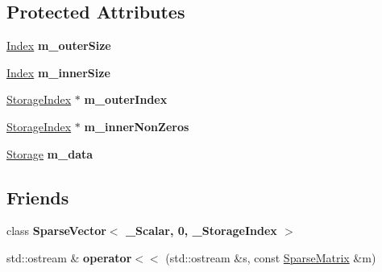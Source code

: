 \subsection*{Protected Attributes}
\begin{DoxyCompactItemize}
\item 
\mbox{\label{class_eigen_1_1_sparse_matrix_a0863037124fae230905554497c39b03d}} 
\mbox{\hyperlink{struct_eigen_1_1_eigen_base_a554f30542cc2316add4b1ea0a492ff02}{Index}} {\bfseries m\+\_\+outer\+Size}
\item 
\mbox{\label{class_eigen_1_1_sparse_matrix_ac4c5c183471051e78473ca19558286e4}} 
\mbox{\hyperlink{struct_eigen_1_1_eigen_base_a554f30542cc2316add4b1ea0a492ff02}{Index}} {\bfseries m\+\_\+inner\+Size}
\item 
\mbox{\label{class_eigen_1_1_sparse_matrix_a33d0828b875d1d7abec88788d449f7a9}} 
\mbox{\hyperlink{class_eigen_1_1_sparse_matrix_base_a0b540ba724726ebe953f8c0df06081ed}{Storage\+Index}} $\ast$ {\bfseries m\+\_\+outer\+Index}
\item 
\mbox{\label{class_eigen_1_1_sparse_matrix_a342c970e29c69072e71167fad8c1c352}} 
\mbox{\hyperlink{class_eigen_1_1_sparse_matrix_base_a0b540ba724726ebe953f8c0df06081ed}{Storage\+Index}} $\ast$ {\bfseries m\+\_\+inner\+Non\+Zeros}
\item 
\mbox{\label{class_eigen_1_1_sparse_matrix_a55f0527dabecf758e72abdb57db7aad3}} 
\mbox{\hyperlink{class_eigen_1_1internal_1_1_compressed_storage}{Storage}} {\bfseries m\+\_\+data}
\end{DoxyCompactItemize}
\subsection*{Friends}
\begin{DoxyCompactItemize}
\item 
\mbox{\label{class_eigen_1_1_sparse_matrix_aa9c5c76b222bc68de7cb0865290e73aa}} 
class {\bfseries Sparse\+Vector$<$ \+\_\+\+Scalar, 0, \+\_\+\+Storage\+Index $>$}
\item 
\mbox{\label{class_eigen_1_1_sparse_matrix_ae7cb03fccbdb1456601051ffa6522c46}} 
std\+::ostream \& {\bfseries operator$<$$<$} (std\+::ostream \&s, const \mbox{\hyperlink{class_eigen_1_1_sparse_matrix}{Sparse\+Matrix}} \&m)
\end{DoxyCompactItemize}
